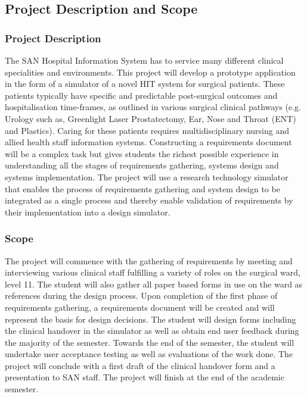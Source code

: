 \subsection{Project Description and Scope}
\subsubsection{Project Description}
The SAN Hospital Information System has to service many different clinical specialities and environments. This project will develop a prototype application in the form of a simulator of a novel HIT system for surgical patients. These patients typically have specific and predictable post-surgical outcomes and hospitalisation time-frames, as outlined in various surgical clinical pathways (e.g. Urology such as, Greenlight Laser Prostatectomy, Ear, Nose and Throat (ENT) and Plastics). Caring for these patients requires multidisciplinary nursing and allied health staff information systems.
Constructing a requirements document will be a complex task but gives students the richest possible experience in understanding all the stages of requirements gathering, systems design and systems implementation. The project will use a research technology simulator that enables the process of requirements gathering and system design to be integrated as a single process and thereby enable validation of requirements by their implementation into a design simulator. 

\subsubsection{Scope}
The project will commence with the gathering of requirements by meeting and interviewing various clinical staff fulfilling a variety of roles on the surgical ward, level 11. The student will also gather all paper based forms in use on the ward as references during the design process. Upon completion of the first phase of requirements gathering, a requirements document will be created and will represent the basis for design decisions. The student will design forms including the clinical handover in the simulator as well as obtain end user feedback during the majority of the semester. Towards the end of the semester, the student will undertake user acceptance testing as well as evaluations of the work done. The project will conclude with a first draft of the clinical handover form and a presentation to SAN staff. The project will finish at the end of the academic semester.

